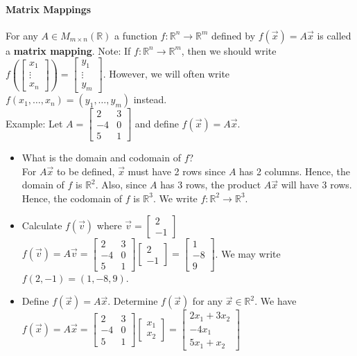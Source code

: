 \documentclass[10pt,letter]{article}
\begin{document}
\paragraph{Matrix Mappings} For any $A\in M_{m\times n}(\mathbb{R})$ a function $f:\mathbb{R}^n\rightarrow\mathbb{R}^m$ defined by $f(\vec{x})=A\vec{x}$ is called a \textbf{matrix mapping}. Note: If $f:\mathbb{R}^n\rightarrow\mathbb{R}^m$, then we should write $f\left(\begin{bmatrix}x_1\\\vdots\\x_n\end{bmatrix}\right)=\begin{bmatrix}y_1\\\vdots\\y_m\end{bmatrix}$. However, we will often write $f(x_1,\ldots,x_n)=(y_1,\ldots,y_m)$ instead. \\ 
Example: Let $A=\begin{bmatrix}2&3\\-4&0\\5&1\end{bmatrix}$ and define $f(\vec{x})=A\vec{x}$.\begin{itemize}
    \item What is the domain and codomain of $f$?  \\ 
For $A\vec{x}$ to be defined, $\vec{x}$ must have 2 rows since $A$ has 2 columns. Hence, the domain of $f$ is $\mathbb{R}^2$. Also, since $A$ has 3 rows, the product $A\vec{x}$ will have 3 rows. Hence, the codomain of $f$ is $\mathbb{R}^3$. We write $f:\mathbb{R}^2\rightarrow\mathbb{R}^3$. 
\item Calculate $f(\vec{v})$ where $\vec{v}=\begin{bmatrix}2\\-1\end{bmatrix}$ \\ 
$f(\vec{v})=A\vec{v}=\begin{bmatrix}2&3\\-4&0\\5&1\end{bmatrix}\begin{bmatrix}2\\-1\end{bmatrix} = \begin{bmatrix}1\\-8\\9\end{bmatrix}$. We may write $f(2,-1)=(1,-8,9)$. 
    \item Define $f(\vec{x})=A\vec{x}$. Determine $f(\vec{x})$ for any $\vec{x}\in\mathbb{R}^2$. We have $f(\vec{x})=A\vec{x}=\begin{bmatrix}2&3\\-4&0\\5&1\end{bmatrix}\begin{bmatrix}x_1\\x_2\end{bmatrix} = \begin{bmatrix}2x_1+3x_2\\-4x_1\\5x_1+x_2\end{bmatrix}$
\end{itemize} 
\end{document}

